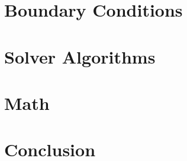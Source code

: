 \documentclass[conf]{new-aiaa}
\newcommand{\TexDir}{./attachments/tex/}
\begin{document}


\clearpage
\FloatBarrier
\section{Boundary Conditions}






\clearpage
\FloatBarrier
\section{Solver Algorithms}








\clearpage
\FloatBarrier
\section{Math}







\section{Conclusion}





\end{document}
